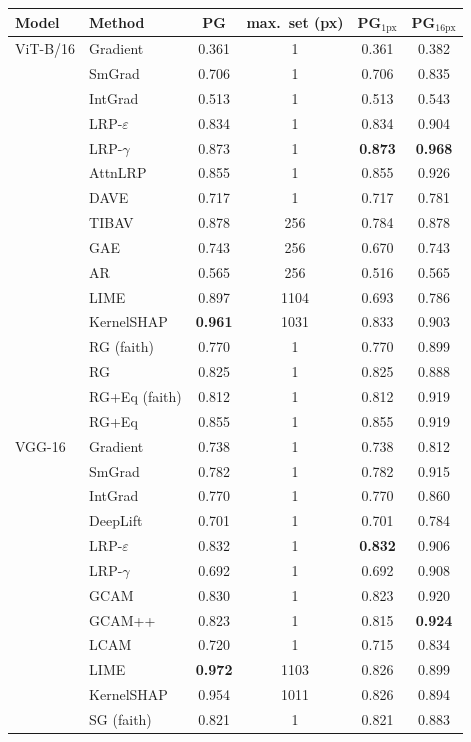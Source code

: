 \begin{tabular}{@{}l l c c c c@{}}
\toprule
Model & Method & PG & max.\ set (px) & PG$_{1\mathrm{px}}$ & PG$_{16\mathrm{px}}$ \\
\midrule
ViT-B/16 & Gradient & 0.361 & 1 & 0.361 & 0.382 \\
 & SmGrad & 0.706 & 1 & 0.706 & 0.835 \\
 & IntGrad & 0.513 & 1 & 0.513 & 0.543 \\
 & LRP-$\varepsilon$ & 0.834 & 1 & 0.834 & 0.904 \\
 & LRP-$\gamma$ & 0.873 & 1 & \textbf{0.873} & \textbf{0.968} \\
 & AttnLRP & 0.855 & 1 & 0.855 & 0.926 \\
 & DAVE & 0.717 & 1 & 0.717 & 0.781 \\
 & TIBAV & 0.878 & 256 & 0.784 & 0.878 \\
 & GAE & 0.743 & 256 & 0.670 & 0.743 \\
 & AR & 0.565 & 256 & 0.516 & 0.565 \\
 & LIME & 0.897 & 1104 & 0.693 & 0.786 \\
 & KernelSHAP & \textbf{0.961} & 1031 & 0.833 & 0.903 \\
 & RG (faith) & 0.770 & 1 & 0.770 & 0.899 \\
 & RG & 0.825 & 1 & 0.825 & 0.888 \\
 & RG+Eq (faith) & 0.812 & 1 & 0.812 & 0.919 \\
 & RG+Eq & 0.855 & 1 & 0.855 & 0.919 \\
\midrule
VGG-16 & Gradient & 0.738 & 1 & 0.738 & 0.812 \\
 & SmGrad & 0.782 & 1 & 0.782 & 0.915 \\
 & IntGrad & 0.770 & 1 & 0.770 & 0.860 \\
 & DeepLift & 0.701 & 1 & 0.701 & 0.784 \\
 & LRP-$\varepsilon$ & 0.832 & 1 & \textbf{0.832} & 0.906 \\
 & LRP-$\gamma$ & 0.692 & 1 & 0.692 & 0.908 \\
 & GCAM & 0.830 & 1 & 0.823 & 0.920 \\
 & GCAM++ & 0.823 & 1 & 0.815 & \textbf{0.924} \\
 & LCAM & 0.720 & 1 & 0.715 & 0.834 \\
 & LIME & \textbf{0.972} & 1103 & 0.826 & 0.899 \\
 & KernelSHAP & 0.954 & 1011 & 0.826 & 0.894 \\
 & SG (faith) & 0.821 & 1 & 0.821 & 0.883 \\

\end{tabular}
